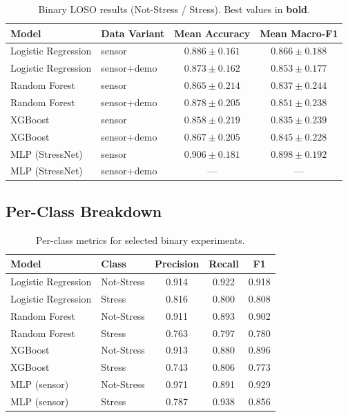 \documentclass[11pt]{article}
\begin{document}
\begin{table}[H]
\centering
\caption{Binary LOSO results (Not-Stress / Stress). Best values in \textbf{bold}.}
\label{tab:binary}
\begin{tabular}{llcc}
\toprule
\textbf{Model} & \textbf{Data Variant} & \textbf{Mean Accuracy} & \textbf{Mean Macro-F1} \\
\midrule
Logistic Regression & sensor        & $0.886 \pm 0.161$ & $0.866 \pm 0.188$ \\
Logistic Regression & sensor+demo   & $0.873 \pm 0.162$ & $0.853 \pm 0.177$ \\
\midrule
Random Forest       & sensor        & $0.865 \pm 0.214$ & $0.837 \pm 0.244$ \\
Random Forest       & sensor+demo   & $0.878 \pm 0.205$ & $0.851 \pm 0.238$ \\
\midrule
XGBoost             & sensor        & $0.858 \pm 0.219$ & $0.835 \pm 0.239$ \\
XGBoost             & sensor+demo   & $0.867 \pm 0.205$ & $0.845 \pm 0.228$ \\
\midrule
MLP (StressNet)     & sensor        & $\mathbf{0.906 \pm 0.181}$ & $\mathbf{0.898 \pm 0.192}$ \\
MLP (StressNet)     & sensor+demo   & --- & --- \\
\bottomrule
\end{tabular}
\end{table}

\subsection{Per-Class Breakdown}

\begin{table}[H]
\centering
\caption{Per-class metrics for selected binary experiments.}
\label{tab:binary-perclass}
\begin{tabular}{llccc}
\toprule
\textbf{Model} & \textbf{Class} & \textbf{Precision} & \textbf{Recall} & \textbf{F1} \\
\midrule
Logistic Regression & Not-Stress & 0.914 & 0.922 & 0.918 \\
Logistic Regression & Stress     & 0.816 & 0.800 & 0.808 \\
\midrule
Random Forest & Not-Stress & 0.911 & 0.893 & 0.902 \\
Random Forest & Stress     & 0.763 & 0.797 & 0.780 \\
\midrule
XGBoost & Not-Stress & 0.913 & 0.880 & 0.896 \\
XGBoost & Stress     & 0.743 & 0.806 & 0.773 \\
\midrule
MLP (sensor) & Not-Stress & 0.971 & 0.891 & 0.929 \\
MLP (sensor) & Stress     & 0.787 & 0.938 & 0.856 \\
\bottomrule
\end{tabular}
\end{table}
\end{document}
